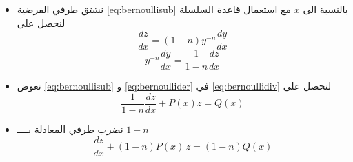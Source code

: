 		\begin{frame}
			\begin{itemize}
				\item نشتق طرفي الفرضية \eqref{eq:bernoullisub} بالنسبة الى $x$ مع استعمال قاعدة السلسلة لنحصل على 
			\[
			\frac{dz}{dx} = (1-n)y^{-n} \frac{dy}{dx}
			\]
			\begin{equation}
				\label{eq:bernoullider}
				y^{-n}\frac{dy}{dx} = \frac{1}{1-n}\frac{dz}{dx}
			\end{equation}
			
			\item نعوض \eqref{eq:bernoullisub} و \eqref{eq:bernoullider} في \eqref{eq:bernoullidiv} لنحصل على 
			\begin{equation*}
				\frac{1}{1-n} \frac{dz}{dx} + P(x) z = Q(x)
			\end{equation*}
			
			\item نضرب طرفي المعادلة بــــ $1-n$
			\begin{equation}
				\label{eq:bernoulilinear}
				\frac{dz}{dx} + (1-n)P(x) \, z = (1-n)Q(x)
			\end{equation}
			\end{itemize}
		\end{frame}
		
